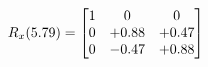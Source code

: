 \documentclass[preview]{standalone}
\begin{document}
\begin{align*}
\special{dvisvgm:raw <g id='unique000'>}R_{x}(5.79) = \begin{bmatrix}1 & 0 & 0 \\0 & +0.88 & +0.47 \\0 & -0.47 & +0.88\end{bmatrix}\special{dvisvgm:raw </g>}
\end{align*}
\end{document}
